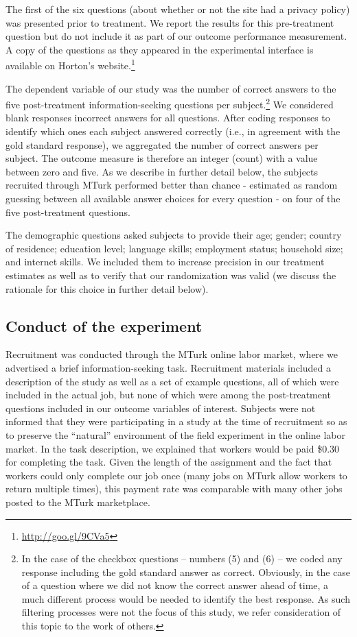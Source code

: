 \documentclass{cscw2010}
\begin{document}
The first of the six questions (about whether or not the site had a
privacy policy) was presented prior to treatment. We report the
results for this pre-treatment question but do not include it as part
of our outcome performance measurement.  A copy of the questions as they appeared in the experimental interface is
available on Horton's website.\footnote{\href{http://goo.gl/9CVa5}{http://goo.gl/9CVa5}
}

The dependent variable of our study was the number of correct answers
to the five post-treatment information-seeking questions per
subject.\footnote{In the case of the checkbox questions -- numbers (5)
  and (6) -- we coded any response including the gold standard answer
  as correct. Obviously, in the case of a question where we did not
  know the correct answer ahead of time, a much different process
  would be needed to identify the best response. As such filtering
  processes were not the focus of this study, we refer consideration
  of this topic to the work of others.\cite{snow2008cheap}} We
considered blank responses incorrect answers for all questions. After
coding responses to identify which ones each subject answered correctly
(i.e., in agreement with the gold standard response), we aggregated
the number of correct answers per subject. The outcome measure is
therefore an integer (count) with a value between zero and five. As we
describe in further detail below, the subjects recruited through MTurk performed
better than chance - estimated as random guessing between all
available answer choices for every question - on four of the five
post-treatment questions.

The demographic questions asked subjects to provide their age; gender;
country of residence; education level; language skills; employment
status; household size; and internet skills. We included them to
increase precision in our treatment estimates as well as to verify
that our randomization was valid (we discuss the rationale for this
choice in further detail below).

\subsection{Conduct of the experiment}

Recruitment was conducted through the MTurk online labor market, where
we advertised a brief information-seeking task. Recruitment materials
included a description of the study as well as a set of example
questions, all of which were included in the actual job, but none of
which were among the post-treatment questions included in our outcome
variables of interest. Subjects were not informed that they were
participating in a study at the time of recruitment so as to preserve
the ``natural'' environment of the field experiment in the online
labor market. In the task description, we explained that workers would
be paid \$0.30 for completing the task. Given the length of the
assignment and the fact that workers could only complete our job once
(many jobs on MTurk allow workers to return multiple times), this
payment rate was comparable with many other jobs posted to the MTurk
marketplace.
\end{document}
